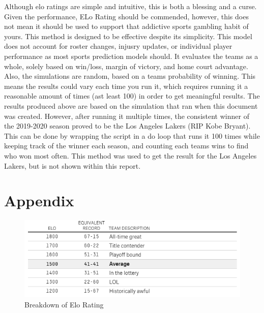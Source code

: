 \documentclass[]{article}
\begin{document}
Although elo ratings are simple and intuitive, this is both a blessing
and a curse. Given the performance, ELo Rating should be commended,
however, this does not mean it should be used to support that addictive
sports gambling habit of yours. This method is designed to be effective
despite its simplicity. This model does not account for roster changes,
injusry updates, or individual player performance as most sports
prediction models should. It evaluates the teams as a whole, solely
based on win/loss, margin of victory, and home court advantage. Also,
the simulations are random, based on a teams probability of winning.
This means the results could vary each time you run it, which requires
running it a reasonable amount of times (ast least 100) in order to get
meaningful results. The results produced above are based on the
simulation that ran when this document was created. However, after
running it multiple times, the consistent winner of the 2019-2020 season
proved to be the Los Angeles Lakers (RIP Kobe Bryant). This can be done
by wrapping the script in a do loop that runs it 100 times while keeping
track of the winner each season, and counting each teams wins to find
who won most often. This method was used to get the result for the Los
Angeles Lakers, but is not shown within this report.

\hypertarget{appendix}{%
\section{Appendix}\label{appendix}}

\begin{figure}[H]

{\centering \includegraphics[width=.49\linewidth]{./EloChart} 

}

\caption{\label{fig:elo_chart}Breakdown of Elo Rating}\label{fig:unnamed-chunk-21}
\end{figure}
\end{document}
